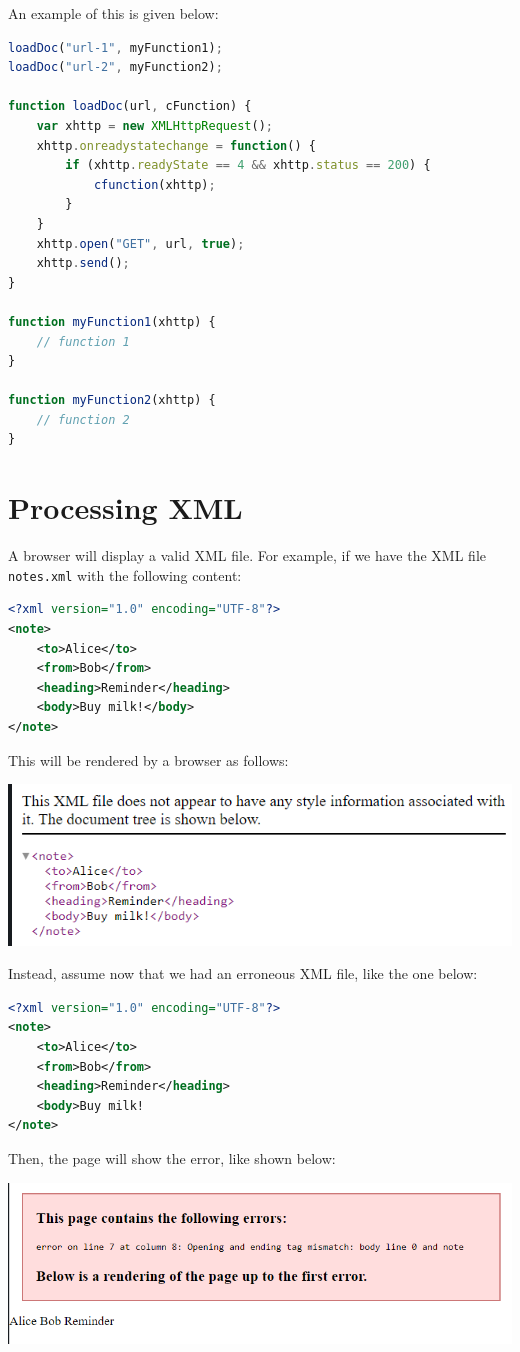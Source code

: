 \documentclass[a4paper, openany]{memoir}
\begin{document}
\noindent An example of this is given below:
\begin{lstlisting}[language=javascript]
loadDoc("url-1", myFunction1);
loadDoc("url-2", myFunction2);

function loadDoc(url, cFunction) {
    var xhttp = new XMLHttpRequest();
    xhttp.onreadystatechange = function() {
        if (xhttp.readyState == 4 && xhttp.status == 200) {
            cfunction(xhttp);
        }
    }
    xhttp.open("GET", url, true);
    xhttp.send();
}

function myFunction1(xhttp) {
    // function 1
}

function myFunction2(xhttp) {
    // function 2
}
\end{lstlisting}
\newpage

\section{Processing XML}
A browser will display a valid XML file. For example, if we have the XML file \texttt{notes.xml} with the following content:
\begin{lstlisting}[language=xml]
<?xml version="1.0" encoding="UTF-8"?>
<note>
    <to>Alice</to>
    <from>Bob</from>
    <heading>Reminder</heading>
    <body>Buy milk!</body>
</note>
\end{lstlisting}
This will be rendered by a browser as follows:
\begin{center}
    \includegraphics[scale=0.7]{src/XML1.PNG}
\end{center}
Instead, assume now that we had an erroneous XML file, like the one below:
\begin{lstlisting}[language=xml]
<?xml version="1.0" encoding="UTF-8"?>
<note>
    <to>Alice</to>
    <from>Bob</from>
    <heading>Reminder</heading>
    <body>Buy milk!
</note>
\end{lstlisting}
Then, the page will show the error, like shown below:
\begin{center}
    \includegraphics[scale=0.7]{src/XML2.PNG}
\end{center}
\end{document}
